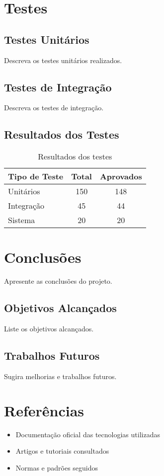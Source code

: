 \documentclass[12pt,a4paper]{article}
\begin{document}
\section{Testes}

\subsection{Testes Unitários}

Descreva os testes unitários realizados.

\subsection{Testes de Integração}

Descreva os testes de integração.

\subsection{Resultados dos Testes}

\begin{table}[h]
  \centering
  \begin{tabular}{|l|c|c|}
    \hline
    \textbf{Tipo de Teste} & \textbf{Total} & \textbf{Aprovados} \\
    \hline
    Unitários & 150 & 148 \\
    Integração & 45 & 44 \\
    Sistema & 20 & 20 \\
    \hline
  \end{tabular}
  \caption{Resultados dos testes}
  \label{tab:testes}
\end{table}

\section{Conclusões}

Apresente as conclusões do projeto.

\subsection{Objetivos Alcançados}

Liste os objetivos alcançados.

\subsection{Trabalhos Futuros}

Sugira melhorias e trabalhos futuros.

\section{Referências}

\begin{itemize}
  \item Documentação oficial das tecnologias utilizadas
  \item Artigos e tutoriais consultados
  \item Normas e padrões seguidos
\end{itemize}
\end{document}
